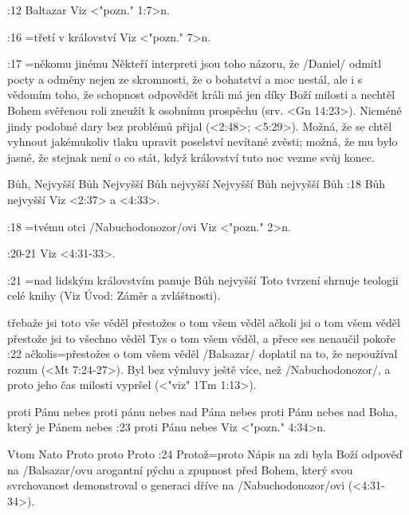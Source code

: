      
:12 {Baltazar} Viz <"pozn." 1:7>n.     
     
:16 {}={třetí v království} Viz  <"pozn." 7>n.     
     
:17 {}={někomu jinému} Někteří interpreti jsou toho názoru, že \x/Daniel/ odmítl pocty a odměny nejen ze skromnosti, že o bohatství a moc nestál, ale i s vědomím toho, že schopnost odpovědět králi má jen díky Boží milosti a nechtěl Bohem svěřenou roli zneužít k osobnímu prospěchu (srv. <Gn 14:23>). Nicméně jindy podobné dary bez problémů přijal (<2:48>; <5:29>). Možná, že se chtěl vyhnout jakémukoliv tlaku upravit poselství nevítané zvěsti; možná, že mu bylo jasné, že stejnak není o co stát, když království tuto noc vezme svůj konec.
     
    {Bůh, Nejvyšší}   %
    {Bůh Nejvyšší}   %
    {Bůh nejvyšší}   %
    {Nejvyšší Bůh}   %
    {nejvyšší Bůh}   %
:18 {Bůh nejvyšší}   Viz <2:37> a  <4:33>.     
     
:18 {}={tvému otci \x/Nabuchodonozor/ovi}   Viz <"pozn." 2>n.
     
:20-21 {} Viz  <4:31-33>.     
     
:21 {}={nad lidským královstvím panuje Bůh nejvyšší} Toto tvrzení shrnuje teologii celé knihy (Viz Úvod: Záměr a zvláštnosti).     
     
    {třebaže jsi toto vše věděl}   %
    {přestožes o tom všem věděl}   %
    {ačkoli jsi o tom všem věděl}   %
    {přestože jsi to všechno věděl}   %
    {Tys o tom všem věděl, a přece ses nenaučil pokoře}   %
:22 {ačkolis}={přestožes o tom všem věděl} \x/Balsazar/ doplatil na to, že nepoužíval rozum  (<Mt 7:24-27>). Byl bez výmluvy ještě více, než \x/Nabuchodonozor/, a proto jeho čas milosti vypršel  (<"viz" 1Tm 1:13>).     
\dopsat %
     
     
    {proti Pánu nebes} %
    {proti pánu nebes}  %
    {nad Pána nebes} %
    {proti Pánu nebes}  %
    {nad Boha, který je Pánem nebes}  %
:23 {proti Pánu nebes}  Viz <"pozn." 4:34>n.     

    {Vtom}   %
    {Nato}   %
    {Proto}   %
    {proto}   %
    {Proto}   %
:24 {Protož}={proto} Nápis na zdi byla Boží odpověď na \x/Balsazar/ovu arogantní pýchu a zpupnost před Bohem, který svou svrchovanost demonstroval o generaci dříve na \x/Nabuchodonozor/ovi  (<4:31-34>).     
     
